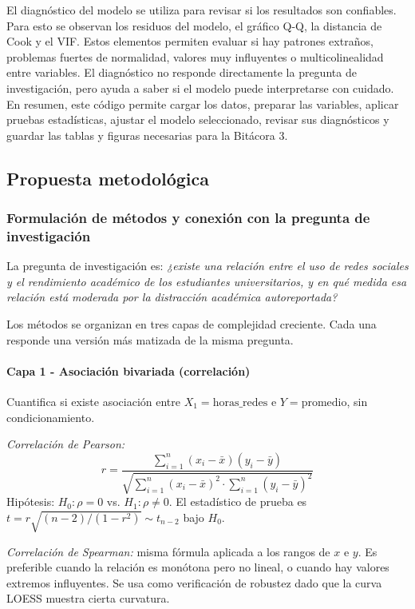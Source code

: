 \documentclass[12pt]{article}
\begin{document}
El diagnóstico del modelo se utiliza para revisar si los resultados son confiables. Para esto se observan los residuos del modelo, el gráfico Q-Q, la distancia de Cook y el VIF. Estos elementos permiten evaluar si hay patrones extraños, problemas fuertes de normalidad, valores muy influyentes o multicolinealidad entre variables. El diagnóstico no responde directamente la pregunta de investigación, pero ayuda a saber si el modelo puede interpretarse con cuidado.
\\

En resumen, este código permite cargar los datos, preparar las variables, aplicar pruebas estadísticas, ajustar el modelo seleccionado, revisar sus diagnósticos y guardar las tablas y figuras necesarias para la Bitácora 3.

\subsection{Propuesta metodológica}
\subsubsection{Formulación de métodos y conexión con la pregunta de investigación}

La pregunta de investigación es: \textit{¿existe una relación entre el uso de redes sociales y el rendimiento académico de los estudiantes universitarios, y en qué medida esa relación está moderada por la distracción académica autoreportada?}

Los métodos se organizan en tres capas de complejidad creciente. Cada una responde una versión más matizada de la misma pregunta.

\paragraph{Capa 1 - Asociación bivariada (correlación)}

Cuantifica si existe asociación entre \(X_1 = \text{horas\_redes}\) e \(Y = \text{promedio}\), sin condicionamiento.

\textit{Correlación de Pearson:}
\[
r = \frac{\sum_{i=1}^{n}(x_i - \bar{x})(y_i - \bar{y})}{\sqrt{\sum_{i=1}^{n}(x_i - \bar{x})^2 \cdot \sum_{i=1}^{n}(y_i - \bar{y})^2}}
\]
Hipótesis: \(H_0: \rho = 0\) vs. \(H_1: \rho \neq 0\). El estadístico de prueba es \(t = r\sqrt{(n-2)/(1-r^2)} \sim t_{n-2}\) bajo \(H_0\).

\textit{Correlación de Spearman:} misma fórmula aplicada a los rangos de \(x\) e \(y\). Es preferible cuando la relación es monótona pero no lineal, o cuando hay valores extremos influyentes. Se usa como verificación de robustez dado que la curva LOESS muestra cierta curvatura.
\end{document}
